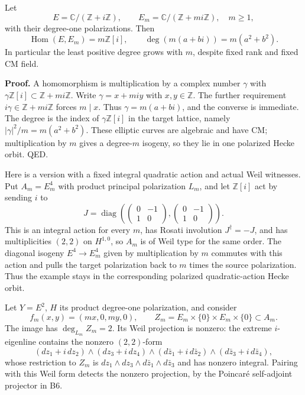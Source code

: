 \documentclass[11pt,a4paper]{article}
\theoremstyle{definition}
\begin{document}
Let \[
 E=\mathbb C/(\mathbb Z+i\mathbb Z),\qquad
 E_m=\mathbb C/(\mathbb Z+mi\mathbb Z),\quad m\ge1,
\] with their degree-one polarizations. Then \[
 \operatorname{Hom}(E,E_m)=m\mathbb Z[i],\qquad
 \deg(m(a+bi))=m(a^2+b^2).
\tag{B11.1}
\] In particular the least positive degree grows with \(m\), despite fixed rank and fixed CM field.

\textbf{Proof.} A homomorphism is multiplication by a complex number \(\gamma\) with \(\gamma\mathbb Z[i]\subset\mathbb Z+mi\mathbb Z\). Write \(\gamma=x+mi y\) with \(x,y\in\mathbb Z\). The further requirement \(i\gamma\in\mathbb Z+mi\mathbb Z\) forces \(m\mid x\). Thus \(\gamma=m(a+bi)\), and the converse is immediate. The degree is the index of \(\gamma\mathbb Z[i]\) in the target lattice, namely \(|\gamma|^2/m=m(a^2+b^2)\). These elliptic curves are algebraic and have CM; multiplication by \(m\) gives a degree-\(m\) isogeny, so they lie in one polarized Hecke orbit. QED.

Here is a version with a fixed integral quadratic action and actual Weil witnesses. Put \(A_m=E_m^4\) with product principal polarization \(L_m\), and let \(\mathbb Z[i]\) act by sending \(i\) to \[
 J=\operatorname{diag}\left(
 \begin{pmatrix}0&-1\\1&0\end{pmatrix},
 \begin{pmatrix}0&-1\\1&0\end{pmatrix}\right).
\] This is an integral action for every \(m\), has Rosati involution \(J^\dagger=-J\), and has multiplicities \((2,2)\) on \(H^{1,0}\), so \(A_m\) is of Weil type for the same order. The diagonal isogeny \(E^4\to E_m^4\) given by multiplication by \(m\) commutes with this action and pulls the target polarization back to \(m\) times the source polarization. Thus the example stays in the corresponding polarized quadratic-action Hecke orbit.

Let \(Y=E^2\), \(H\) its product degree-one polarization, and consider \[
 f_m(x,y)=(mx,0,my,0),\qquad
 Z_m=E_m\times\{0\}\times E_m\times\{0\}\subset A_m.
\] The image has \(\deg_{L_m}Z_m=2\). Its Weil projection is nonzero: the extreme \(i\)-eigenline contains the nonzero \((2,2)\)-form \[
 (dz_1+i\,dz_2)\wedge(dz_3+i\,dz_4)
 \wedge(d\bar z_1+i\,d\bar z_2)
 \wedge(d\bar z_3+i\,d\bar z_4),
\] whose restriction to \(Z_m\) is \(dz_1\wedge dz_3\wedge d\bar z_1\wedge d\bar z_3\) and has nonzero integral. Pairing with this Weil form detects the nonzero projection, by the Poincaré self-adjoint projector in B6.
\end{document}
